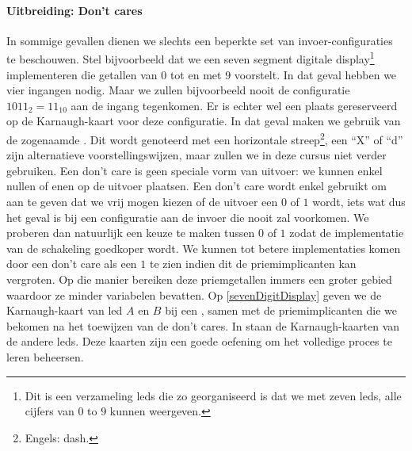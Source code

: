\paragraph{Uitbreiding: Don't cares}
In sommige gevallen dienen we slechts een beperkte set van invoer-configuraties te beschouwen. Stel bijvoorbeeld dat we een seven segment digitale display\footnote{Dit is een verzameling leds die zo georganiseerd is dat we met zeven leds, alle cijfers van $0$ to $9$ kunnen weergeven.} implementeren die getallen van $0$ tot en met $9$ voorstelt. In dat geval hebben we vier ingangen nodig. Maar we zullen bijvoorbeeld nooit de configuratie $1011_2=11_{10}$ aan de ingang tegenkomen. Er is echter wel een plaats gereserveerd op de Karnaugh-kaart voor deze configuratie. In dat geval maken we gebruik van de zogenaamde . Dit wordt genoteerd met een horizontale streep\footnote{Engels: dash.}, een ``X'' of ``d'' zijn alternatieve voorstellingswijzen, maar zullen we in deze cursus niet verder gebruiken. Een don't care is geen speciale vorm van uitvoer: we kunnen enkel nullen of enen op de uitvoer plaatsen. Een don't care wordt enkel gebruikt om aan te geven dat we vrij mogen kiezen of de uitvoer een $0$ of $1$ wordt, iets wat dus het geval is bij een configuratie aan de invoer die nooit zal voorkomen. We proberen dan natuurlijk een keuze te maken tussen $0$ of $1$ zodat de implementatie van de schakeling goedkoper wordt. We kunnen tot betere implementaties komen door een don't care als een $1$ te zien indien dit de priemimplicanten kan vergroten. Op die manier bereiken deze priemgetallen immers een groter gebied waardoor ze minder variabelen bevatten. Op \ref{sevenDigitDisplay} geven we de Karnaugh-kaart van led $A$ en $B$ bij een , samen met de priemimplicanten die we bekomen na het toewijzen van de don't cares. In  staan de Karnaugh-kaarten van de andere leds. Deze kaarten zijn een goede oefening om het volledige proces te leren beheersen.

